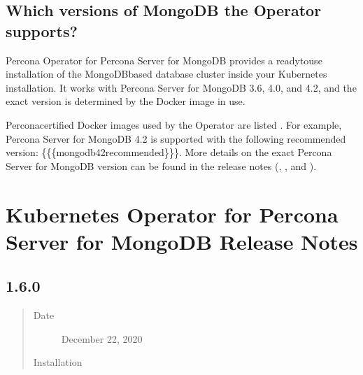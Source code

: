 \documentclass[letterpaper,10pt,english]{sphinxmanual}
\begin{document}
\section{Which versions of MongoDB the Operator supports?}
\label{\detokenize{faq:which-versions-of-mongodb-the-operator-supports}}
Percona Operator for Percona Server for MongoDB provides a ready\sphinxhyphen{}to\sphinxhyphen{}use
installation of the MongoDB\sphinxhyphen{}based database cluster inside your Kubernetes
installation. It works with Percona Server for MongoDB 3.6, 4.0, and 4.2, and
the exact version is determined by the Docker image in use.

Percona\sphinxhyphen{}certified Docker images used by the Operator are listed .
For example, Percona Server for MongoDB 4.2 is supported with the following
recommended version: \{\{\{mongodb42recommended\}\}\}. More details on the exact Percona
Server for MongoDB version can be found in the release notes (, ,
and ).


\chapter{Kubernetes Operator for Percona Server for MongoDB Release Notes}
\label{\detokenize{RN/index:kubernetes-operator-for-percona-server-for-mongodb-release-notes}}\label{\detokenize{RN/index:rel-notes}}\label{\detokenize{RN/index::doc}}

\section{ 1.6.0}
\label{\detokenize{RN/Kubernetes-Operator-for-PSMONGODB-RN1.6.0:percona-kubernetes-operator-for-percona-server-for-mongodb-1-6-0}}\label{\detokenize{RN/Kubernetes-Operator-for-PSMONGODB-RN1.6.0:k8spsmdb-1-6-0}}\label{\detokenize{RN/Kubernetes-Operator-for-PSMONGODB-RN1.6.0::doc}}\begin{quote}\begin{description}
\item[{Date}] \leavevmode
December 22, 2020

\item[{Installation}] \leavevmode
{}

\end{description}\end{quote}
\end{document}
